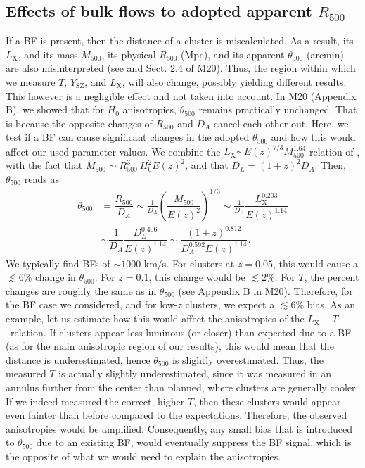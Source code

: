\documentclass{aa}   %
\newcommand{\LT}{$L_{\text{X}}-T$}
\newcommand{\Lx}{$L_{\text{X}}$}
\newcommand{\Ysz}{$Y_{\text{SZ}}$}
\begin{document}
\subsection{Effects of bulk flows to adopted apparent $R_{500}$}
If a BF is present, then the distance of a cluster is miscalculated. As a result, its \Lx, and its mass $M_{500}$, its physical $R_{500}$ (Mpc), and its apparent ${\theta}_{500}$ (arcmin) are also misinterpreted (see \citealt{mcxc} and Sect. 2.4 of M20). Thus, the region within which we measure $T$, \Ysz, and \Lx, will also change, possibly yielding different results. This however is a negligible effect and not taken into account. In M20 (Appendix B), we showed that for $H_0$ anisotropies, ${\theta}_{500}$ remains practically unchanged. That is because the opposite changes of $R_{500}$ and $D_A$ cancel each other out. Here, we test if a BF can cause significant changes in the adopted ${\theta}_{500}$ and how this would affect our used parameter values. We combine the \Lx$\sim E(z)^{7/3} M_{500}^{1.64}$ relation of \citet{arnaud2}, with the fact that $M_{500}\sim R_{500}^3 \ H_0^2E(z)^2$, and that $D_L=(1+z)^2D_A$. Then, ${\theta}_{500}$ reads as
\begin{equation}
\begin{aligned}
{\theta}_{500}&=\dfrac{R_{500}}{D_A}\sim \frac{1}{D_A}\left(\dfrac{M_{500}}{E(z)^2}\right)^{1/3}\sim \frac{1}{D_A} \dfrac{L_{\text{X}}^{0.203}}{E(z)^{1.14}}\\
&\sim \dfrac{1}{D_A}\dfrac{D_L^{0.406}}{E(z)^{1.14}}\sim \dfrac{(1+z)^{0.812}}{D_A^{0.592}E(z)^{1.14}}.
\label{r500}
\end{aligned}
\end{equation}
We typically find BFs of $\sim 1000$ km/s. For clusters at $z=0.05$, this would cause a $\lesssim 6\%$ change in ${\theta}_{500}$. For $z=0.1$, this change would be $\lesssim 2\%$. For $T$, the percent changes are roughly the same as in ${\theta}_{500}$ (see Appendix B in M20). Therefore, for the BF case we considered, and for low-$z$ clusters, we expect a $\lesssim 6\%$ bias. As an example, let us estimate how this would affect the anisotropies of the \LT\ relation. If clusters appear less luminous (or closer) than expected due to a BF (as for the main anisotropic region of our results), this would mean that the distance is underestimated, hence ${\theta}_{500}$ is slightly overestimated. Thus, the measured $T$ is actually slightly underestimated, since it was measured in an annulus further from the center than planned, where clusters are generally cooler. If we indeed measured the correct, higher $T$, then these clusters would appear even fainter than before compared to the expectations. Therefore, the observed anisotropies would be amplified. Consequently, any small bias that is introduced to ${\theta}_{500}$ due to an existing BF, would eventually suppress the BF signal, which is the opposite of what we would need to explain the anisotropies. 
\end{document}
